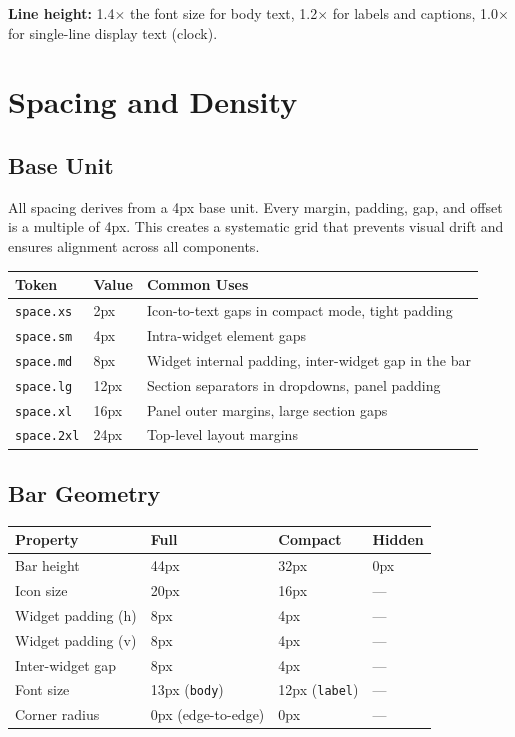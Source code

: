 \documentclass[11pt,a4paper]{article}
\begin{document}
\textbf{Line height:} 1.4$\times$ the font size for body text, 1.2$\times$ for labels and captions, 1.0$\times$ for single-line display text (clock).


\section{Spacing and Density}
\label{sec:spacing}

\subsection{Base Unit}

All spacing derives from a 4px base unit. Every margin, padding, gap, and offset is a multiple of 4px. This creates a systematic grid that prevents visual drift and ensures alignment across all components.

\begin{longtable}{p{3cm} p{2cm} p{8.5cm}}
\toprule
\textbf{Token} & \textbf{Value} & \textbf{Common Uses} \\
\midrule
\texttt{space.xs} & 2px & Icon-to-text gaps in compact mode, tight padding \\
\texttt{space.sm} & 4px & Intra-widget element gaps \\
\texttt{space.md} & 8px & Widget internal padding, inter-widget gap in the bar \\
\texttt{space.lg} & 12px & Section separators in dropdowns, panel padding \\
\texttt{space.xl} & 16px & Panel outer margins, large section gaps \\
\texttt{space.2xl} & 24px & Top-level layout margins \\
\bottomrule
\end{longtable}

\subsection{Bar Geometry}

\begin{longtable}{p{4cm} p{2cm} p{2cm} p{2cm}}
\toprule
\textbf{Property} & \textbf{Full} & \textbf{Compact} & \textbf{Hidden} \\
\midrule
Bar height & 44px & 32px & 0px \\
Icon size & 20px & 16px & --- \\
Widget padding (h) & 8px & 4px & --- \\
Widget padding (v) & 8px & 4px & --- \\
Inter-widget gap & 8px & 4px & --- \\
Font size & 13px (\texttt{body}) & 12px (\texttt{label}) & --- \\
Corner radius & 0px (edge-to-edge) & 0px & --- \\
\bottomrule
\end{longtable}
\end{document}
